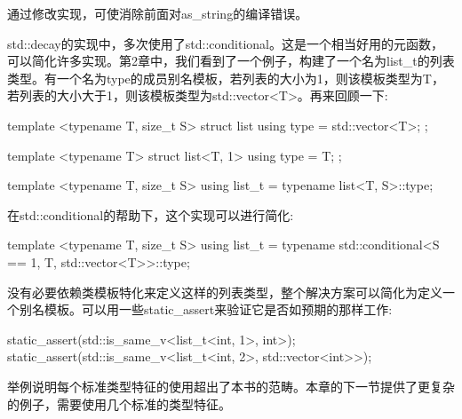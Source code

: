 通过修改实现，可使消除前面对as\_string的编译错误。

std::decay的实现中，多次使用了std::conditional。这是一个相当好用的元函数，可以简化许多实现。第2章中，我们看到了一个例子，构建了一个名为list\_t的列表类型。有一个名为type的成员别名模板，若列表的大小为1，则该模板类型为T，若列表的大小大于1，则该模板类型为std::vector<T>。再来回顾一下:

\begin{cpp}
template <typename T, size_t S>
struct list
{
	using type = std::vector<T>;
};

template <typename T>
struct list<T, 1>
{
	using type = T;
};

template <typename T, size_t S>
using list_t = typename list<T, S>::type;
\end{cpp}

在std::conditional的帮助下，这个实现可以进行简化:

\begin{cpp}
template <typename T, size_t S>
using list_t =
	typename std::conditional<S ==
					1, T, std::vector<T>>::type;
\end{cpp}

没有必要依赖类模板特化来定义这样的列表类型，整个解决方案可以简化为定义一个别名模板。可以用一些static\_assert来验证它是否如预期的那样工作:

\begin{cpp}
static_assert(std::is_same_v<list_t<int, 1>, int>);
static_assert(std::is_same_v<list_t<int, 2>,
							std::vector<int>>);
\end{cpp}

举例说明每个标准类型特征的使用超出了本书的范畴。本章的下一节提供了更复杂的例子，需要使用几个标准的类型特征。



























